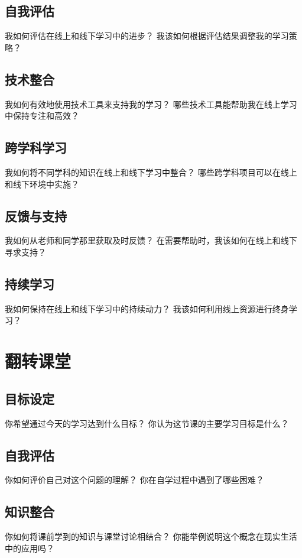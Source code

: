 \documentclass[12pt]{book}
\begin{document}
\subsection{自我评估}
我如何评估在线上和线下学习中的进步？
我该如何根据评估结果调整我的学习策略？

\subsection{技术整合}
我如何有效地使用技术工具来支持我的学习？
哪些技术工具能帮助我在线上学习中保持专注和高效？

\subsection{跨学科学习}
我如何将不同学科的知识在线上和线下学习中整合？
哪些跨学科项目可以在线上和线下环境中实施？

\subsection{反馈与支持}
我如何从老师和同学那里获取及时反馈？
在需要帮助时，我该如何在线上和线下寻求支持？

\subsection{持续学习}
我如何保持在线上和线下学习中的持续动力？
我该如何利用线上资源进行终身学习？


\section{翻转课堂}
\subsection{目标设定}
你希望通过今天的学习达到什么目标？
你认为这节课的主要学习目标是什么？

\subsection{自我评估}
你如何评价自己对这个问题的理解？
你在自学过程中遇到了哪些困难？

\subsection{知识整合}
你如何将课前学到的知识与课堂讨论相结合？
你能举例说明这个概念在现实生活中的应用吗？
\end{document}
